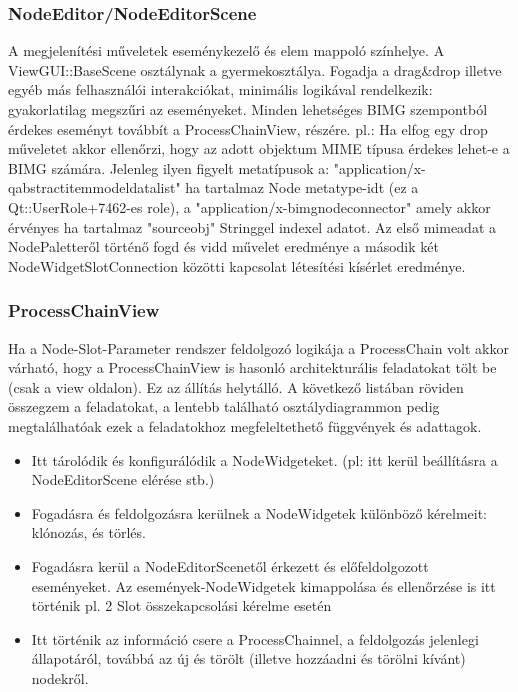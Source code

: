 \documentclass[a4paper,12pt,oneside]{report}
\begin{document}
\subsubsection{NodeEditor/NodeEditorScene}
A megjelenítési műveletek eseménykezelő és elem mappoló színhelye. A ViewGUI::BaseScene osztálynak a gyermekosztálya. Fogadja a drag\&drop illetve egyéb más felhasználói interakciókat, minimális logikával rendelkezik: gyakorlatilag megszűri az eseményeket. Minden lehetséges BIMG szempontból érdekes eseményt továbbít a ProcessChainView, részére. pl.: Ha elfog egy drop műveletet akkor ellenőrzi, hogy az adott objektum MIME típusa érdekes lehet-e a BIMG számára.
Jelenleg ilyen figyelt metatípusok a: "application/x-qabstractitemmodeldatalist" ha tartalmaz Node metatype-idt (ez a Qt::UserRole+7462-es role), a "application/x-bimgnodeconnector" amely akkor érvényes ha tartalmaz "sourceobj" Stringgel indexel adatot. Az első mimeadat a NodePaletteről történő fogd és vidd művelet eredménye a második két NodeWidgetSlotConnection közötti kapcsolat létesítési kísérlet eredménye.

\subsubsection{ProcessChainView}
Ha a Node-Slot-Parameter rendszer feldolgozó logikája a ProcessChain volt akkor várható, hogy a ProcessChainView is hasonló architekturális feladatokat tölt be (csak a view oldalon).
Ez az állítás helytálló. A következő listában röviden összegzem a feladatokat, a lentebb található osztálydiagrammon pedig megtalálhatóak ezek a feladatokhoz megfeleltethető függvények és adattagok.
\begin{itemize}
	\itemsep0em
	\item Itt tárolódik és konfigurálódik a NodeWidgeteket. (pl: itt kerül beállításra a NodeEditorScene elérése stb.)
	\item Fogadásra és feldolgozásra kerülnek a NodeWidgetek különböző kérelmeit: klónozás, és törlés.
	\item Fogadásra kerül a NodeEditorScenetől érkezett és előfeldolgozott eseményeket. Az események-NodeWidgetek kimappolása és ellenőrzése is itt történik pl. 2 Slot összekapcsolási kérelme esetén
	\item Itt történik az információ csere a ProcessChainnel, a feldolgozás jelenlegi állapotáról, továbbá az új és törölt (illetve hozzáadni és törölni kívánt) nodekről.
\end{itemize}
\end{document}
